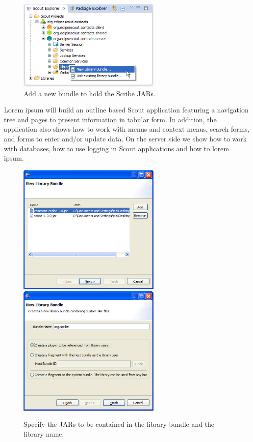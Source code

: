 \documentclass[a4paper,10pt,twoside]{book}
\begin{document}
\begin{figure}
\includegraphics[width=7cm]{new_library_scribe_contextmenu.png} \hspace{5mm}
\caption{Add a new bundle to hold the Scribe JARs.}
\end{figure}

Lorem ipsum will build an outline based Scout application featuring a navigation tree and pages to present information in tabular form. 
In addition, the application also shows how to work with menus and context menus, search forms, and forms to enter and/or update data. 
On the server side we show how to work with databases, how to use logging in Scout applications and how to lorem ipsum. 

\begin{figure}
\includegraphics[width=7cm]{new_library_scribe_1.png} \hspace{5mm}
\includegraphics[width=7cm]{new_library_scribe_2.png}
\caption{Specify the JARs to be contained in the library bundle and the library name.}
\end{figure}
\end{document}
